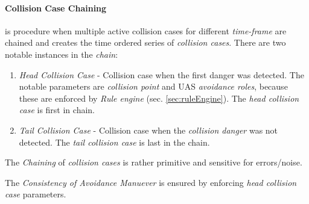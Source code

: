 \paragraph{Collision Case Chaining} is procedure when multiple active collision cases for different \emph{time-frame} are chained and creates the time ordered series of \emph{collision cases}. There are two notable instances in the \emph{chain}:
\begin{enumerate}
    \item \emph{Head Collision Case} - Collision case when the first danger was detected. The notable parameters are \emph{collision point} and UAS \emph{avoidance roles}, because these are enforced by \emph{Rule engine} (sec. \ref{sec:ruleEngine}). The \emph{head collision case} is first in chain.
    
    \item \emph{Tail Collision Case} -  Collision case when the \emph{collision danger} was not detected. The \emph{tail collision case} is last in the chain.  
\end{enumerate}

\begin{note}
    The \emph{Chaining} of \emph{collision cases} is rather primitive and sensitive for errors/noise.
    
    The \emph{Consistency of Avoidance Manuever} is ensured by enforcing \emph{head collision case} parameters. 
\end{note}

